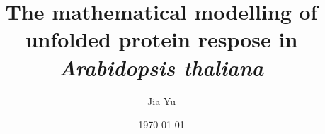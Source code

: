 \documentclass[a4paper,12pt]{book}
\begin{document}
\graphicspath{{C:/Users/giaccoyu/Desktop/TeXWorks/Fig/Presentations/}}

\author{Jia Yu}
\title{The mathematical modelling of unfolded protein respose in \textit{Arabidopsis thaliana} }
\date{\today}

\frontmatter
\maketitle
\linespread{0.8}
\listoffigures
\listoftables
\tableofcontents


\mainmatter
\linespread{1.2}







\backmatter

\end{document}
